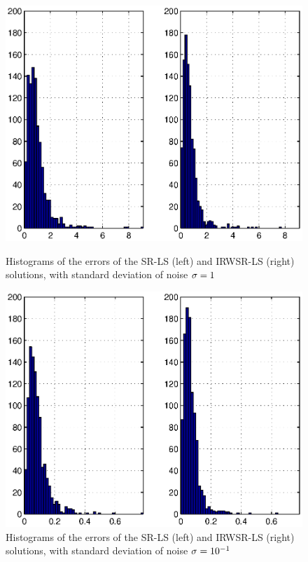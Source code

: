 \begin{figure}[h]
\centering
\includegraphics[width=1\textwidth,height=0.4\textheight]{figures/range_dif_IRWLS/Noise00LeftBeckRightRD}%
\caption{Histograms of the errors of the SR-LS (left) and IRWSR-LS (right) solutions, with standard deviation of noise $\protect\sigma = 1$}
\label{fig:Noise00IRDW}
\centering
\includegraphics[width=1\textwidth,height=0.4\textheight]{figures/range_dif_IRWLS/Noise01LeftBeckRightRD}%
\caption{Histograms of the errors of the SR-LS (left) and IRWSR-LS (right) solutions, with standard deviation of noise  $\protect\sigma = 10^{-1}$}
\label{fig:Noise01IRDW}
\end{figure}

